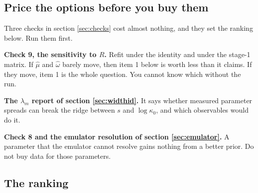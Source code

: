 \documentclass[11pt]{article}
\begin{document}
\subsection{Price the options before you buy them}

Three checks in section \ref{sec:checks} cost almost nothing, and they set the
ranking below. Run them first.

\textbf{Check 9, the sensitivity to $R$.} Refit under the identity and under the
stage-1 matrix. If $\hat\mu$ and $\hat\omega$ barely move, then item 1 below is
worth less than it claims. If they move, item 1 is the whole question. You
cannot know which without the run.

\textbf{The $\lambda_m$ report of section \ref{sec:widthid}.} It says whether
measured parameter spreads can break the ridge between $s$ and $\log\kappa_0$,
and which observables would do it.

\textbf{Check 8 and the emulator resolution of section \ref{sec:emulator}.} A
parameter that the emulator cannot resolve gains nothing from a better prior.
Do not buy data for those parameters.

\subsection{The ranking}
\end{document}
